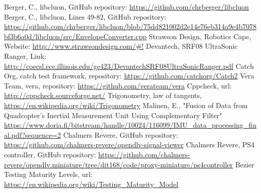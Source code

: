 \documentclass[12pt]{article}
\begin{document}
\def\refname{References} %
\begin{thebibliography}{00}
	 Berger, C., libcluon, GitHub repository: \url{https://github.com/chrberger/libcluon}
	 Berger, C., libcluon, Lines 49-82, GitHub repository: \url{https://github.com/chrberger/libcluon/blob/75dd821002d2e14e76eb314a9e4b7078bf3b6a0d/libcluon/src/EnvelopeConverter.cpp}
	 Strawson Design, Robotics Cape, Website: \url{http://www.strawsondesign.com/\#!}
	 Devantech, SRF08 UltraSonic Ranger, Link: \url{http://coecsl.ece.illinois.edu/ge423/DevantechSRF08UltraSonicRanger.pdf}
	 Catch Org, catch test framework, repository: \url{https://github.com/catchorg/Catch2}
	 Vera Team, vera, repository: \url{https://github.com/verateam/vera}
	 Cppcheck, url: \url{http://cppcheck.sourceforge.net/}
	 Trigonometry, law of tangents, \url{https://en.wikipedia.org/wiki/Trigonometry}
	 Malinen, E., "Fusion of Data from Quadcopter’s Inertial Measurement Unit Using Complementary Filter" \url{
https://www.doria.fi/bitstream/handle/10024/116099/IMU_data_processing_final.pdf?sequence=2}
	 Chalmers Revere, GitHub repository: \url{https://github.com/chalmers-revere/opendlv-signal-viewer}
	 Chalmers Revere, PS4 controller, GitHub repository: \url{https://github.com/chalmers-revere/opendlv.miniature/tree/dit168/code/proxy-miniature/ps4controller}
	 Bezier Testing Maturity Levels, url: \url{https://en.wikipedia.org/wiki/Testing_Maturity_Model}
\end{thebibliography}
\pagebreak
\end{document}
